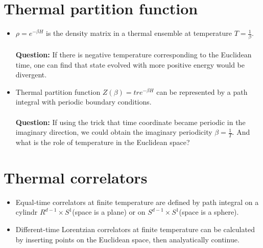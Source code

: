 \documentclass{article}
\begin{document}
\section{Thermal partition function}
\begin{itemize}
\item{$\rho=e^{-\beta H}$ is the density matrix in a thermal ensemble at temperature $T=\frac{1}{\beta}$.}\\~~\\
\textbf{Question:} If there is negative temperature corresponding to the Euclidean time, one can find that state evolved with more positive energy would be divergent.
\item{Thermal partition function $Z(\beta)=tr e^{-\beta H} $ can be represented by a path integral with periodic boundary conditions.}\\~~\\
\textbf{Question:} If using the trick that time coordinate became periodic in the imaginary direction, we could obtain the imaginary periodicity $\beta=\frac{1}{T}$. And what is the role of temperature in the Euclidean space?
\end{itemize}
\section{Thermal correlators}
\begin{itemize}
 \item{Equal-time correlators at finite temperature are defined by path integral on a cylindr $R^{d-1}\times S^{1}$(space is a plane) or
on $S^{d-1}\times S^{1}$(space is a sphere). }
\item{Different-time Lorentzian correlators at finite temperature can be calculated by inserting points on the Euclidean space, then analyatically continue.}
\end{itemize}
\end{document}
